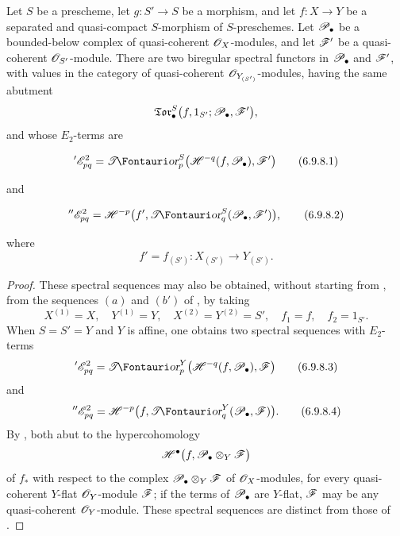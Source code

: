 \begin{proposition}[6.9.8]
\label{III.6.9.8}
Let $S$ be a prescheme, let $g:S'\to S$ be a morphism, and let
$f:X\to Y$ be a separated and quasi-compact $S$-morphism of
$S$-preschemes.  Let $\mathscr{P}_\bullet$ be a bounded-below complex of
quasi-coherent $\mathscr{O}_X$-modules, and let $\mathscr{F}'$ be a
quasi-coherent $\mathscr{O}_{S'}$-module.  There are two biregular
spectral functors in $\mathscr{P}_\bullet$ and $\mathscr{F}'$, with values in
the category of quasi-coherent $\mathscr{O}_{Y_{(S')}}$-modules, having
the same abutment
\[
  \mathfrak{Tor}_\bullet^S
  \bigl(
    f,1_{S'};\mathscr{P}_\bullet,\mathscr{F}'
  \bigr),
\]
and whose $E_2$-terms are
\begin{env}[6.9.8.1]
\label{III.6.9.8.1}
\[
  {}'\sh E_{pq}^2
  =
  \shTor_p^S
  \bigl(
    \sh H^{-q}(f,\sh P_\bullet),\sh F'
  \bigr)
  \tag{6.9.8.1}\label{III.6.9.8.1.eq}
\]
\end{env}
and
\begin{env}[6.9.8.2]
\label{III.6.9.8.2}
\[
  {}''\sh E_{pq}^2
  =
  \sh H^{-p}
  \bigl(
    f',
    \shTor_q^S(\sh P_\bullet,\sh F')
  \bigr),
  \tag{6.9.8.2}\label{III.6.9.8.2.eq}
\]
\end{env}
where
\[
  f'=f_{(S')}:
  X_{(S')}\longrightarrow Y_{(S')}.
\]
\end{proposition}

\begin{proof}
These spectral sequences may also be obtained, without starting
from , from the sequences $(a)$ and $(b')$ of
, by taking
\[
  X^{(1)}=X,\quad
  Y^{(1)}=Y,\quad
  X^{(2)}=Y^{(2)}=S',\quad
  f_1=f,\quad
  f_2=1_{S'}.
\]
When $S=S'=Y$ and $Y$ is affine, one obtains two spectral
sequences with $E_2$-terms
\[
  {}'\sh E_{pq}^2
  =
  \shTor_p^Y
  \bigl(
    \sh H^{-q}(f,\sh P_\bullet),\sh F
  \bigr)
  \tag{6.9.8.3}\label{III.6.9.8.3}
\]
and
\[
  {}''\sh E_{pq}^2
  =
  \sh H^{-p}
  \bigl(
    f,\shTor_q^Y(\sh P_\bullet,\sh F)
  \bigr).
  \tag{6.9.8.4}\label{III.6.9.8.4}
\]
By , both abut to the hypercohomology
\[
  \mathscr{H}^\bullet
  \bigl(
    f,\mathscr{P}_\bullet\otimes_Y\mathscr{F}
  \bigr)
\]
of $f_*$ with respect to the complex
$\mathscr{P}_\bullet\otimes_Y\mathscr{F}$ of $\mathscr{O}_X$-modules, for every
quasi-coherent $Y$-flat $\mathscr{O}_Y$-module $\mathscr{F}$; if the terms of
$\mathscr{P}_\bullet$ are $Y$-flat, $\mathscr{F}$ may be any quasi-coherent
$\mathscr{O}_Y$-module.  These spectral sequences are distinct from
those of .
\end{proof}

